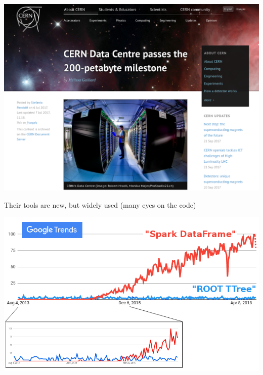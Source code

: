 \documentclass[aspectratio=169]{beamer}
\begin{document}
\begin{frame}{}
\vspace{0.35 cm}
\includegraphics[width=0.73\linewidth]{cern-200pb.png}

\vspace{-4.8 cm}
\end{frame}

\begin{frame}{Their tools are new, but widely used (many eyes on the code)}
\vspace{0.5 cm}
\begin{center}
\includegraphics[width=0.8\linewidth]{root-spark-google-trends.png}
\end{center}
\end{frame}
\end{document}
